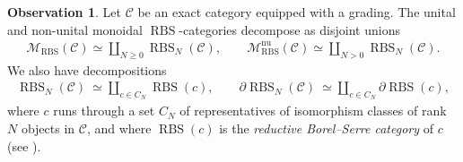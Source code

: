 \documentclass[12pt, reqno]{amsart}
\theoremstyle{plain}
\theoremstyle{definition}
\newtheorem{observation}[theorem]{Observation}
\begin{document}
\begin{observation}\label{RBSN vs reductive borel-serre categories}
Let $\mathcal{C}$ be an exact category equipped with a grading. The unital and non-unital monoidal $\operatorname{RBS}$-categories decompose as disjoint unions
\begin{align*}
\mathscr{M}_{\operatorname{RBS}}(\mathcal{C}) \simeq \coprod_{N\geq 0} \operatorname{RBS}_N(\mathcal{C}),\qquad \mathscr{M}_{\operatorname{RBS}}^{\operatorname{nu}}(\mathcal{C}) \simeq \coprod_{N>0} \operatorname{RBS}_N(\mathcal{C}).
\end{align*}
We also have decompositions
\begin{align*}
\operatorname{RBS}_N(\mathcal{C})\ \simeq \coprod_{c\in C_N} \operatorname{RBS}(c),\qquad \partial\operatorname{RBS}_N(\mathcal{C})\ \simeq \coprod_{c\in C_N} \partial\operatorname{RBS}(c),
\end{align*}
where $c$ runs through a set $C_N$ of representatives of isomorphism classes of rank $N$ objects in $\mathcal{C}$, and where $\operatorname{RBS}(c)$ is the \textit{reductive Borel--Serre category} of $c$ (see ).
\end{observation}
\end{document}
